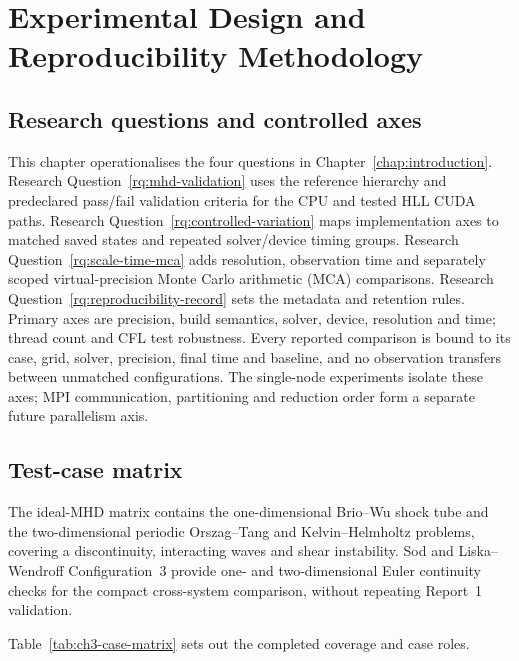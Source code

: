 \chapter{Experimental Design and Reproducibility Methodology}

\section{Research questions and controlled axes}

This chapter operationalises the four questions in
Chapter~\ref{chap:introduction}. Research
Question~\ref{rq:mhd-validation} uses the reference hierarchy and predeclared
pass/fail validation criteria for the CPU and tested HLL CUDA paths. Research
Question~\ref{rq:controlled-variation} maps implementation axes to matched
saved states and repeated solver/device timing groups. Research
Question~\ref{rq:scale-time-mca} adds resolution, observation time and
separately scoped virtual-precision Monte Carlo arithmetic (MCA) comparisons. Research
Question~\ref{rq:reproducibility-record} sets the metadata and retention rules.
Primary axes are precision, build semantics, solver, device, resolution and
time; thread count and CFL test robustness. Every reported comparison is bound
to its case, grid, solver, precision, final time and baseline, and no
observation transfers between unmatched configurations.
The single-node experiments isolate these axes; MPI communication, partitioning
and reduction order form a separate future parallelism axis.

\section{Test-case matrix}

The ideal-MHD matrix contains the one-dimensional Brio--Wu shock tube and the
two-dimensional periodic Orszag--Tang and Kelvin--Helmholtz problems, covering
a discontinuity, interacting waves and shear instability. Sod
\citep{toro2009riemann} and Liska--Wendroff Configuration~3
\citep{liskaWendroff2003comparison} provide one- and two-dimensional Euler
continuity checks for the compact cross-system comparison, without repeating
Report~1 validation.

Table~\ref{tab:ch3-case-matrix} sets out the completed coverage and case roles.

